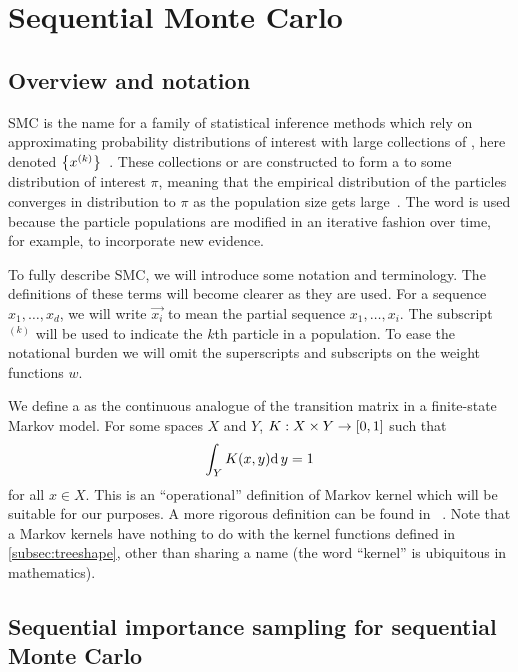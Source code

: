 \section{Sequential Monte Carlo}
\label{sec:smc}


\subsection{Overview and notation}

\Gls{SMC} is the name for a family of statistical inference methods which rely
on approximating probability distributions of interest with large collections
of , here denoted
$\left\lbrace x^{(k)}\right\rbrace$~\autocite{doucet2001introduction, liu2008monte}. These
collections or  are constructed to form a  to some distribution of interest $\pi$, meaning that the
empirical distribution of the particles converges in distribution to $\pi$ as
the population size gets large~\autocite{liu2001theoretical}. The word
 is used because the particle populations are modified in an
iterative fashion over time, for example, to incorporate new evidence. 

To fully describe \gls{SMC}, we will introduce some notation and terminology.
The definitions of these terms will become clearer as they are used. For a
sequence $x_1, \ldots, x_d$, we will write $\vec{x_i}$ to mean the partial
sequence $x_1, \ldots, x_i$. The subscript $^{(k)}$ will be used to indicate
the $k$th particle in a population. To ease the notational burden we will omit
the superscripts and subscripts on the weight functions $w$.

We define a  as the continuous analogue of the transition
matrix in a finite-state Markov model.  For some spaces $X$ and $Y$, $K : X
\times Y \to [0, 1]$ such that
\begin{align}
    \label{eq:mk}
    \int_Y K(x, y) \mathrm{d}\, y = 1
\end{align}
for all $x \in X$. This is an ``operational'' definition of Markov kernel which
will be suitable for our purposes. A more rigorous definition can be found in
\eg~\autocite{kallenberg2006foundations}. Note that a Markov kernels have
nothing to do with the kernel functions defined in \cref{subsec:treeshape},
other than sharing a name (the word ``kernel'' is ubiquitous in mathematics).

\subsection{Sequential importance sampling for sequential Monte Carlo}
\label{subsec:sis}

